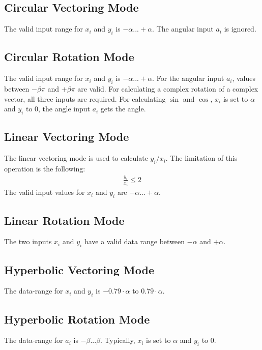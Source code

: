\documentclass[a4paper, 12pt, notitlepage]{report}
\begin{document}
   \subsection{Circular Vectoring Mode}
   
      The valid input range for $x_i$ and $y_i$ is $-\alpha ... +\alpha$.
      The angular input $a_i$ is ignored.
   
   \subsection{Circular Rotation Mode}
      The valid input range for $x_i$ and $y_i$ is $-\alpha ... +\alpha$.
      For the angular input $a_i$, values between $-\beta\pi$ and $+\beta\pi$ are valid.
      For calculating a complex rotation of a complex vector, all three inputs
      are required. For calculating $\sin$ and $\cos$, $x_i$ is set to $\alpha$
      and $y_i$ to 0, the angle input $a_i$ gets the angle.
   
   \subsection{Linear Vectoring Mode}
      The linear vectoring mode is used to calculate $y_i / x_i$. The limitation
      of this operation is the following:
      \begin{eqnarray}
         \frac{y_i}{x_i} \le 2
      \end{eqnarray}
      The valid input values for $x_i$ and $y_i$ are $-\alpha ... +\alpha$.
   
   \subsection{Linear Rotation Mode}
      The two inputs $x_i$ and $y_i$ have a valid data range between $-\alpha$ and $+\alpha$.


   \subsection{Hyperbolic Vectoring Mode}
      The data-range for $x_i$ and $y_i$ is $-0.79 \cdot \alpha$ to $0.79 \cdot \alpha$.


   \subsection{Hyperbolic Rotation Mode}
      The data-range for $a_i$ is $-\beta ... \beta$. Typically, $x_i$ is set to 
      $\alpha$ and $y_i$ to 0.
\end{document}

